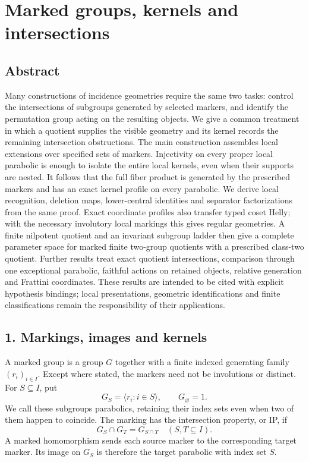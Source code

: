 \documentclass[
  11pt,
  a4paper,
]{article}
\author{}
\date{}
\begin{document}
\section{Marked groups, kernels and
intersections}\label{marked-groups-kernels-and-intersections}

\subsection{Abstract}\label{abstract}

Many constructions of incidence geometries require the same two tasks:
control the intersections of subgroups generated by selected markers,
and identify the permutation group acting on the resulting objects. We
give a common treatment in which a quotient supplies the visible
geometry and its kernel records the remaining intersection obstructions.
The main construction assembles local extensions over specified sets of
markers. Injectivity on every proper local parabolic is enough to
isolate the entire local kernels, even when their supports are nested.
It follows that the full fiber product is generated by the prescribed
markers and has an exact kernel profile on every parabolic. We derive
local recognition, deletion maps, lower-central identities and separator
factorizations from the same proof. Exact coordinate profiles also
transfer typed coset Helly; with the necessary involutory local markings
this gives regular geometries. A finite nilpotent quotient and an
invariant subgroup ladder then give a complete parameter space for
marked finite two-group quotients with a prescribed class-two quotient.
Further results treat exact quotient intersections, comparison through
one exceptional parabolic, faithful actions on retained objects,
relative generation and Frattini coordinates. These results are intended
to be cited with explicit hypothesis bindings; local presentations,
geometric identifications and finite classifications remain the
responsibility of their applications.

\subsection{1. Markings, images and
kernels}\label{markings-images-and-kernels}

A marked group is a group \(G\) together with a finite indexed
generating family \((r_i)_{i\in I}\). Except where stated, the markers
need not be involutions or distinct. For \(S\subseteq I\), put \[
G_S=\langle r_i:i\in S\rangle,\qquad G_\varnothing=1.
\] We call these subgroups parabolics, retaining their index sets even
when two of them happen to coincide. The marking has the intersection
property, or IP, if \[
G_S\cap G_T=G_{S\cap T}\quad(S,T\subseteq I).
\tag{1.1}
\] A marked homomorphism sends each source marker to the corresponding
target marker. Its image on \(G_S\) is therefore the target parabolic
with index set \(S\).
\end{document}
